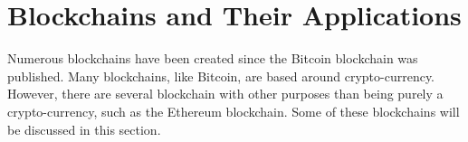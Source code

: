 





\section{Blockchains and Their Applications}
Numerous blockchains have been created since the Bitcoin blockchain was published. Many blockchains, like Bitcoin, are based around crypto-currency. However, there are several blockchain with other purposes than being purely a crypto-currency, such as the Ethereum blockchain. Some of these blockchains will be discussed in this section.

